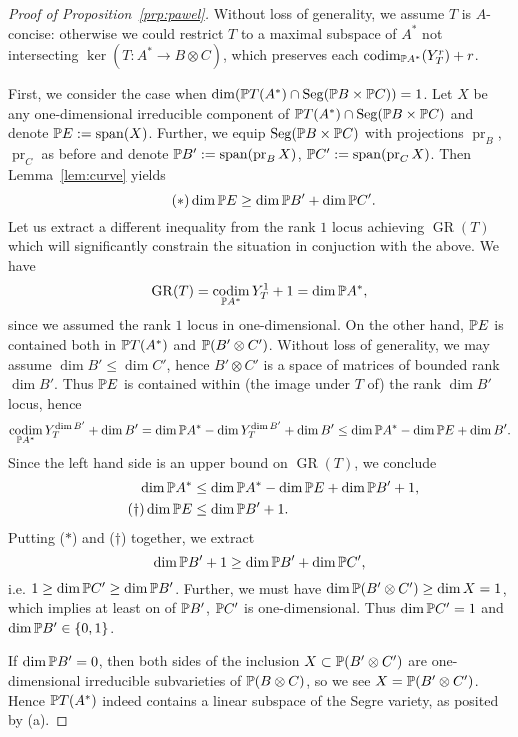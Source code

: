 \documentclass[a4paper,10pt]{article}
\def\set#1{\left\{#1\right\}}
\DeclareMathOperator{\codim}{codim}
\DeclareMathOperator{\Seg}{Seg}
\DeclareMathOperator{\GR}{GR}
\DeclareMathOperator{\pr}{pr}
\DeclareMathOperator{\spn}{span}
\theoremstyle{definition}
\theoremstyle{remark}
\begin{document}
\begin{proof}[Proof of Proposition~\ref{prp:pawel}]
    Without loss of generality, we assume $T$ is $A$-concise: otherwise we could restrict $T$ to a maximal subspace of $A^*$ not intersecting $\ker(T:A^*\to B\otimes C)$, which preserves each $\codim_{\pe A^*}(Y^r_T)+r$.

    First, we consider the case when $\dim(\pe T(A^*)\cap \Seg(\pe B\times \pe C))=1$. Let $X$ be any one-dimensional irreducible component of $\pe T(A^*)\cap \Seg(\pe B\times \pe C)$ and denote $\pe E:=\spn(X)$. Further, we equip $\Seg(\pe B\times\pe C)$ with projections $\pr_B$, $\pr_C$ as before and denote $\pe B':=\spn(\pr_B X)$, $\pe C' := \spn(\pr_C X)$. Then Lemma~\ref{lem:curve} yields
    \begin{equation}
        \tag{$\ast$}
        \dim\pe E \geq \dim\pe B' + \dim\pe C'.
    \end{equation}
    Let us extract a different inequality from the rank $1$ locus achieving $\GR(T)$ which will significantly constrain the situation in conjuction with the above. We have
    \[
        \GR(T) = \codim_{\pe A^*} Y^1_T + 1 = \dim\pe A^*,
    \]
    since we assumed the rank $1$ locus in one-dimensional. On the other hand, $\pe E$ is contained both in $\pe T(A^*)$ and $\pe(B'\otimes C')$. Without loss of generality, we may assume $\dim B'\leq \dim C'$, hence $B'\otimes C'$ is a space of matrices of bounded rank $\dim B'$. Thus $\pe E$ is contained within (the image under $T$ of) the rank $\dim B'$ locus, hence
    \[
        \codim_{\pe A^*}Y^{\dim B'}_T+\dim B' = \dim\pe A^* - \dim Y^{\dim B'}_T +\dim B' \leq \dim \pe A^* -\dim\pe E +\dim B'.
    \]
    Since the left hand side is an upper bound on $\GR(T)$, we conclude
    \begin{align}
        \nonumber
        \dim \pe A^* &\leq \dim\pe A^* - \dim\pe E + \dim \pe B' + 1,\\
        \tag{$\dag$}
        \dim \pe E &\leq \dim\pe B'+1.
    \end{align}
    Putting ($\ast$) and ($\dag$) together, we extract
    \[
        \dim\pe B'+1 \geq \dim\pe B'+\dim\pe C',
    \]
    i.e. $1\geq\dim\pe C'\geq\dim\pe B'$. Further, we must have $\dim\pe(B'\otimes C')\geq\dim X = 1$, which implies at least on of $\pe B'$, $\pe C'$ is one-dimensional. Thus $\dim\pe C' = 1$ and $\dim\pe B'\in\set{0,1}$.

    If $\dim\pe B' = 0$, then both sides of the inclusion $X\subset\pe (B'\otimes C')$ are one-dimensional irreducible subvarieties of $\pe(B\otimes C)$, so we see $X=\pe(B'\otimes C')$. Hence $\pe T(A^*)$ indeed contains a linear subspace of the Segre variety, as posited by (a).


\end{proof}
\end{document}
